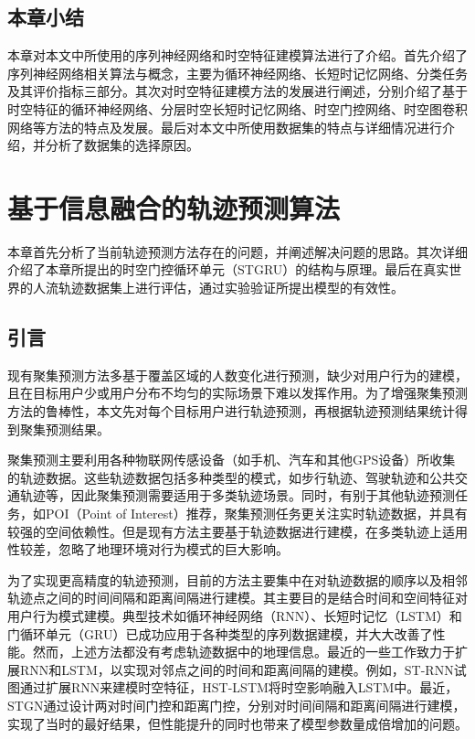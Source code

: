 \documentclass[master]{thesis-uestc}
\begin{document}
\section{本章小结}
本章对本文中所使用的序列神经网络和时空特征建模算法进行了介绍。首先介绍了序列神经网络相关算法与概念，主要为循环神经网络、长短时记忆网络、分类任务及其评价指标三部分。其次对时空特征建模方法的发展进行阐述，分别介绍了基于时空特征的循环神经网络、分层时空长短时记忆网络、时空门控网络、时空图卷积网络等方法的特点及发展。最后对本文中所使用数据集的特点与详细情况进行介绍，并分析了数据集的选择原因。

\chapter{基于信息融合的轨迹预测算法}
本章首先分析了当前轨迹预测方法存在的问题，并阐述解决问题的思路。其次详细介绍了本章所提出的时空门控循环单元（STGRU）的结构与原理。最后在真实世界的人流轨迹数据集上进行评估，通过实验验证所提出模型的有效性。

\section{引言}
现有聚集预测方法多基于覆盖区域的人数变化进行预测，缺少对用户行为的建模，且在目标用户少或用户分布不均匀的实际场景下难以发挥作用。为了增强聚集预测方法的鲁棒性，本文先对每个目标用户进行轨迹预测，再根据轨迹预测结果统计得到聚集预测结果。

聚集预测主要利用各种物联网传感设备（如手机、汽车和其他GPS设备）所收集的轨迹数据。这些轨迹数据包括多种类型的模式，如步行轨迹、驾驶轨迹和公共交通轨迹等，因此聚集预测需要适用于多类轨迹场景。同时，有别于其他轨迹预测任务，如POI（Point of Interest）推荐，聚集预测任务更关注实时轨迹数据，并具有较强的空间依赖性。但是现有方法主要基于轨迹数据进行建模，在多类轨迹上适用性较差，忽略了地理环境对行为模式的巨大影响。

为了实现更高精度的轨迹预测，目前的方法主要集中在对轨迹数据的顺序以及相邻轨迹点之间的时间间隔和距离间隔进行建模。其主要目的是结合时间和空间特征对用户行为模式建模。典型技术如循环神经网络（RNN）、长短时记忆（LSTM）和门循环单元（GRU）已成功应用于各种类型的序列数据建模，并大大改善了性能。然而，上述方法都没有考虑轨迹数据中的地理信息。最近的一些工作致力于扩展RNN和LSTM，以实现对邻点之间的时间和距离间隔的建模。例如，ST-RNN试图通过扩展RNN来建模时空特征，HST-LSTM将时空影响融入LSTM中。最近，STGN通过设计两对时间门控和距离门控，分别对时间间隔和距离间隔进行建模，实现了当时的最好结果，但性能提升的同时也带来了模型参数量成倍增加的问题。
\end{document}
